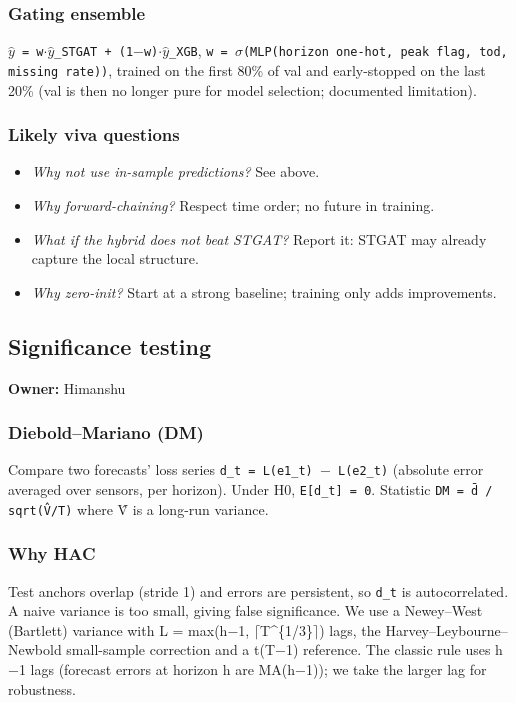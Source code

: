 \documentclass[10pt,a4paper]{article}
\begin{document}
\subsubsection*{Gating ensemble}
\texttt{\ensuremath{\hat{y}} = w\ensuremath{\cdot}\ensuremath{\hat{y}}\_\allowbreak{}STGAT + (1\ensuremath{-}w)\ensuremath{\cdot}\ensuremath{\hat{y}}\_\allowbreak{}XGB}, \texttt{w = \ensuremath{\sigma}(MLP(horizon one-hot, peak flag, tod, missing rate))}, trained on the first 80\% of val and early-stopped on the last 20\% (val is then no longer pure for model selection; documented limitation).

\subsubsection*{Likely viva questions}
\begin{itemize}[nosep,leftmargin=*]
\item \emph{Why not use in-sample predictions?} See above.
\item \emph{Why forward-chaining?} Respect time order; no future in training.
\item \emph{What if the hybrid does not beat STGAT?} Report it: STGAT may already capture the local structure.
\item \emph{Why zero-init?} Start at a strong baseline; training only adds improvements.
\end{itemize}

\subsection*{Significance testing}
\textbf{Owner:} Himanshu

\subsubsection*{Diebold--Mariano (DM)}
Compare two forecasts' loss series \texttt{d\_\allowbreak{}t = L(e1\_\allowbreak{}t) \ensuremath{-} L(e2\_\allowbreak{}t)} (absolute error averaged over sensors, per horizon). Under H0, \texttt{E[d\_\allowbreak{}t] = 0}. Statistic \texttt{DM = d̄ /\allowbreak{} sqrt(V̂/\allowbreak{}T)} where V̂ is a long-run variance.

\subsubsection*{Why HAC}
Test anchors overlap (stride 1) and errors are persistent, so \texttt{d\_\allowbreak{}t} is autocorrelated. A naive variance is too small, giving false significance. We use a Newey--West (Bartlett) variance with L = max(h\ensuremath{-}1, \ensuremath{\lceil}T\^{}\{1/\allowbreak{}3\}\ensuremath{\rceil}) lags, the Harvey--Leybourne--Newbold small-sample correction and a t(T\ensuremath{-}1) reference. The classic rule uses h\ensuremath{-}1 lags (forecast errors at horizon h are MA(h\ensuremath{-}1)); we take the larger lag for robustness.
\end{document}
